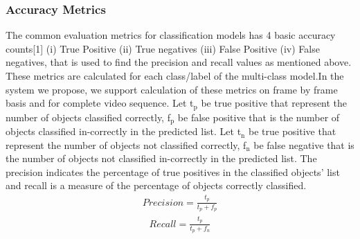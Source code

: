 \documentclass[conference]{IEEEtran}
\begin{document}
\subsubsection{Accuracy Metrics} \label{ref.accuracy}
The common evaluation metrics for classification models has 4 basic accuracy counts[1] (i) True Positive (ii) True negatives (iii) False Positive (iv) False negatives, that is used to find the precision and recall values as mentioned above. These metrics are calculated for each class/label of the multi-class model.In the system we propose, we support calculation of these metrics on frame by frame basis and for complete video sequence. Let t{$_{\text{p}}$} be true positive that represent the number of objects classified correctly, f{$_{\text{p}}$} be false positive that is the number of objects classified in-correctly in the predicted list.  Let t{$_{\text{n}}$} be true positive that represent the number of objects not classified correctly, f{$_{\text{n}}$} be false negative that is the number of objects not classified in-correctly in the predicted list. The precision indicates the percentage of true positives in the classified objects' list and recall is a measure of the percentage of objects correctly classified.
\begin{align}
{Precision}= \frac {t_p} {t_p + f_p}
\end{align}
\begin{align}
{Recall}= \frac {t_p} {t_p + f_n}
\end{align}
\end{document}
